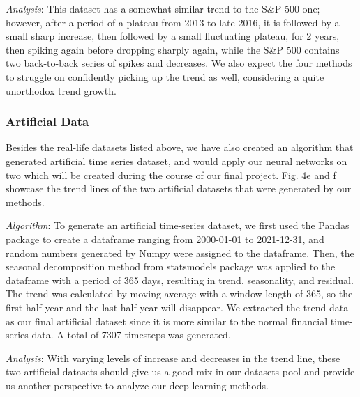 \documentclass[letterpaper, 10 pt, conference]{ieeeconf}  %
\begin{document}
        \textit{Analysis}: This dataset has a somewhat similar trend to the S\&P 500 one; however, after a period of a plateau from 2013 to late 2016, it is followed by a small sharp increase, then followed by a small fluctuating plateau, for 2 years, then spiking again before dropping sharply again, while the S\&P 500 contains two back-to-back series of spikes and decreases. We also expect the four methods to struggle on confidently picking up the trend as well, considering a quite unorthodox trend growth.

        \subsubsection{Artificial Data} Besides the real-life datasets listed above, we have also created an algorithm that generated artificial time series dataset, and would apply our neural networks on two which will be created during the course of our final project. Fig. 4e and f showcase the trend lines of the two artificial datasets that were generated by our methods.

        \textit{Algorithm}: To generate an artificial time-series dataset, we first used the Pandas package to create a dataframe ranging from 2000-01-01 to 2021-12-31,  and random numbers generated by Numpy were assigned to the dataframe. Then, the seasonal decomposition method from statsmodels package was applied to the dataframe with a period of 365 days, resulting in trend, seasonality, and residual. The trend was calculated by moving average with a window length of 365, so the first half-year and the last half year will disappear. We extracted the trend data as our final artificial dataset since it is more similar to the normal financial time-series data. A total of 7307 timesteps was generated.

        \textit{Analysis}: With varying levels of increase and decreases in the trend line, these two artificial datasets should give us a good mix in our datasets pool and provide us another perspective to analyze our deep learning methods.
    
\end{document}
